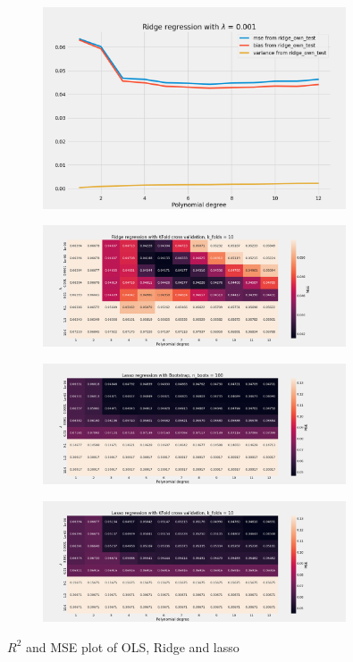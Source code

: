 \begin{figure}[H]
    \centering
    \includegraphics[width=0.8\textwidth]{Figures/e_ridge_bias_variance_lamb_0_001.png}
\end{figure}


\begin{figure}[H]
    \centering
    \includegraphics[width=0.8\textwidth]{Figures/e_ridge_kfold_n_10.png}
\end{figure}



\begin{figure}[H]
    \centering
    \includegraphics[width=0.8\textwidth]{Figures/f_lasso_bootstrap_n_100.png}
\end{figure}

\begin{figure}[H]
    \centering
    \includegraphics[width=0.8\textwidth]{Figures/f_lasso_kfold_n_10.png}
\end{figure}



 

$R^2$ and MSE plot of OLS, Ridge and lasso
